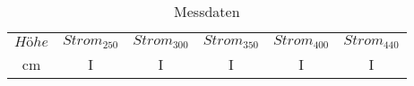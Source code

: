 \documentclass[captions=tableheading]{scrartcl}
\begin{document}
\begin{landscape}


\begin{table}
  \centering
  \caption{Messdaten}
  \label{tab:V502}
  \begin{tabular}{c c c c c c}
    \toprule
    $Höhe$ & $Strom_250$ & $Strom_300$ & $Strom_350$ & $Strom_400$ & $Strom_440$\\
    cm &   I &     I &    I &     I &    I   \\
    \midrule
      
    \bottomrule
  \end{tabular}
\end{table}

\end{landscape}
\end{document}
